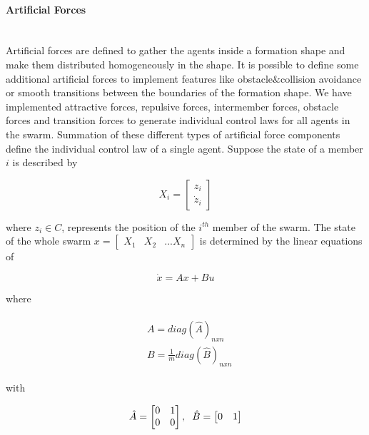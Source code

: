 \paragraph{Artificial Forces}\hspace{0pt} \\ 
Artificial forces are defined to gather the agents inside a formation shape and make them distributed homogeneously in the shape. It is possible to define some additional artificial forces to implement features like obstacle$\&$collision avoidance or smooth transitions between the boundaries of the formation shape. We have implemented attractive forces, repulsive forces, intermember forces, obstacle forces and transition forces to generate individual control laws for all agents in the swarm. Summation of these different types of artificial force components define the individual control law of a single agent. Suppose the state of a member $i$ is described by

\begin{equation}
X_i = \begin{bmatrix}
z_i\\ \dot{z}_i
\end{bmatrix}
\end{equation}

where  $z_i \in C$, represents the position of the $i^{th}$ member of the swarm. The state of the whole swarm $x= \begin{bmatrix}
X_1 & X_2 & ... X_n
\end{bmatrix}$ is determined by the linear equations of \cite{17}

\begin{equation}
\dot{x} = Ax + Bu
\end{equation}

where

\begin{align}
\begin{split}
&A = diag\left(\hat{A}\right)_{nxn}\\
&B = \frac{1}{m} diag\left(\hat{B}\right)_{nxn}
\end{split}
\end{align}

with

\begin{equation}
\hat{A} = \begin{bmatrix}
0&1\\0&0
\end{bmatrix} , \hspace{0.2cm} \hat{B} = \begin{bmatrix}
0&1
\end{bmatrix}
\end{equation}
			
